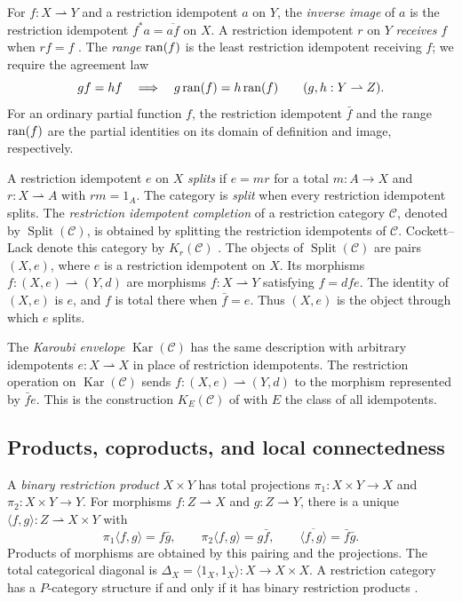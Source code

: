 For $f:X\rightharpoonup Y$ and a restriction idempotent $a$ on $Y$,
the \emph{inverse image} of $a$ is the restriction idempotent
$f^*a=\overline{af}$ on $X$.
A restriction idempotent $r$ on $Y$ \emph{receives} $f$ when $rf=f$
\cite[Section 6]{Heller}.
The \emph{range} $\operatorname{ran}(f)$ is the least restriction idempotent receiving $f$;
we require the agreement law
\[
 gf=hf\quad\Longrightarrow\quad
 g\operatorname{ran}(f)=h\operatorname{ran}(f)
 \qquad(g,h:Y\rightharpoonup Z).
\]
For an ordinary partial function $f$, the restriction idempotent
$\bar f$ and the range $\operatorname{ran}(f)$ are the partial identities on its
domain of definition and image, respectively.

A restriction idempotent $e$ on $X$ \emph{splits} if
$e=mr$ for a total $m:A\to X$ and $r:X\rightharpoonup A$
with $rm=1_A$. The category is \emph{split} when every restriction
idempotent splits.
The \emph{restriction idempotent completion} of a restriction category
$\mathcal C$, denoted by $\operatorname{Split}(\mathcal C)$, is obtained
by splitting the restriction idempotents of $\mathcal C$.
Cockett--Lack denote this category by $K_r(\mathcal C)$
\cite[Section~2.3.3]{CockettLack}.
The objects of $\operatorname{Split}(\mathcal C)$ are pairs $(X,e)$, where $e$ is a
restriction idempotent on $X$. Its morphisms
$f:(X,e)\rightharpoonup(Y,d)$ are morphisms
$f:X\rightharpoonup Y$ satisfying $f=dfe$.
The identity of $(X,e)$ is $e$, and $f$ is total there when
$\bar f=e$. Thus $(X,e)$ is the object through which $e$ splits.

The \emph{Karoubi envelope} $\operatorname{Kar}(\mathcal C)$ has the
same description with arbitrary idempotents $e:X\rightharpoonup X$
in place of restriction idempotents. The restriction operation on
$\operatorname{Kar}(\mathcal C)$ sends
$f:(X,e)\rightharpoonup(Y,d)$ to the morphism represented by $\bar f e$.
This is the construction $K_E(\mathcal C)$ of
\cite[Section~2.3.3, Proposition~2.26]{CockettLack} with $E$ the class
of all idempotents.

\subsection{Products, coproducts, and local connectedness}

A \emph{binary restriction product} $X\times Y$ has total
projections $\pi_1:X\times Y\to X$ and $\pi_2:X\times Y\to Y$.
For morphisms $f:Z\rightharpoonup X$ and $g:Z\rightharpoonup Y$,
there is a unique $\langle f,g\rangle:Z\rightharpoonup X\times Y$
with
\[
 \pi_1\langle f,g\rangle=f\bar g,\qquad
 \pi_2\langle f,g\rangle=g\bar f,\qquad
 \overline{\langle f,g\rangle}=\bar f\bar g.
\]
Products of morphisms are obtained by this pairing and the projections.
The total categorical diagonal is
$\Delta_X=\langle1_X,1_X\rangle:X\to X\times X$.
A restriction category has a $P$-category structure if and only if
it has binary restriction products
\cite[Proposition 4.5]{CockettLackIII}.

